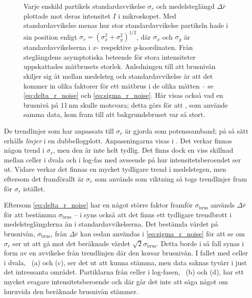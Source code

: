 \begin{figure}\centerline{
   \subfigure[][]{}
   \subfigure[][]{}
   }\centerline{
   \subfigure[][]{}
   \subfigure[][]{}
   }
\caption{Varje enskild partikels standardavvikelse $\sigma_r$ och medelsteglängd $\Delta{\bar{r}}$ plottade mot deras intensitet $I$ i mikroskopet. 
Med standardavvikelse menas hur stor standardavvikelse partikeln hade i sin position enligt $\sigma_r=(\sigma_x^2+\sigma_y^2)^{1/2}$, där $\sigma_x$ och $\sigma_y$ är standardavvikelserna i $x$- respektive $y$-koordinaten.
Från steglängdens asymptotiska beteende för stora intensiteter uppskattades mätbrusets storlek. 
Anledningen till att brusnivån skiljer sig åt mellan medelsteg och standardavvikelse är att det kommer in olika faktorer för ett mätbrus i de olika måtten -- se \eqref{eq:delta_r_noise} och \eqref{eq:sigma_r_noise}. 
Här visas också vad en brusnivå på 11\,nm skulle motsvara; detta görs för att \cite{Midtveldt_etal2016}, som använde samma data, kom fram till att bakgrundsbruset var så stort.}
\label{fig:storleksberoende}
\end{figure}

De trendlinjer som har anpassats till $\sigma_r$ är gjorda som potenssamband; på så sätt erhålls \emph{linjer} i en dubbellogplott. Anpassningarna visas i . Det verkar finnas någon trend i $\sigma_r$, men den är inte helt tydlig. 
Det finns dock en viss skillnad mellan celler i dvala och i log-fas med avseende på hur intensitetsberoendet ser ut. Vidare verkar det finnas en mycket tydligare trend i medelstegen, men eftersom det framförallt är $\sigma_r$ som används som viktning så togs trendlinjer fram för $\sigma_r$ istället.

Eftersom \eqref{eq:delta_r_noise} har en något större faktor framför $\sigma_\text{brus}$ används $\Delta{\bar{r}}$ för att bestämma $\sigma_\text{brus}$ -- i  syns också att det finns ett tydligare trendbrott i medelsteglängderna än i standardavvikelserna. Det bestämda värdet på brusnivån, $\sigma_\text{brus}$, från $\Delta{\bar{r}}$ kan sedan användas i \eqref{eq:sigma_r_noise} för att se om $\sigma_r$ ser ut att gå mot det beräknade värdet $\sqrt{2}\sigma_\text{brus}$. Detta borde i så fall synas i form av en avvikelse från trendlinjen där den korsar brusnivån.
I fallet med celler i dvala, ~(a) och (c), ser det ut att kunna stämma, men data saknas tyvärr i just det intressanta området. Partiklarna från celler i log-fasen, ~(b) och (d), har ett mycket svagare intensitetsberoende och där går det inte att säga något om huruvida den beräknade brusnivån stämmer. 

